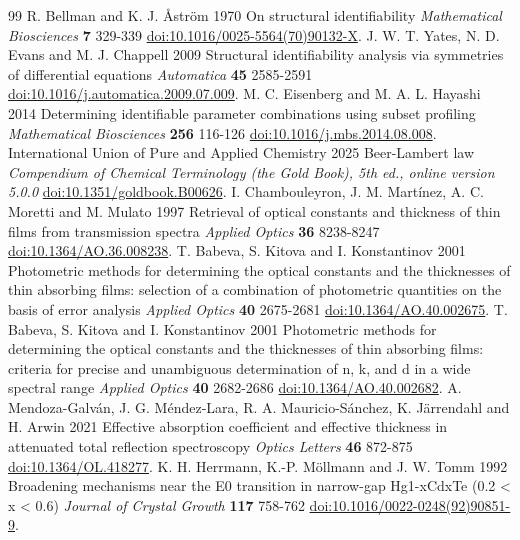 \documentclass[12pt]{article}
\begin{document}
\begin{thebibliography}{99}
 R. Bellman and K. J. Åström 1970 On structural identifiability \textit{Mathematical Biosciences} \textbf{7} 329-339 \href{https://doi.org/10.1016/0025-5564(70)90132-X}{doi:10.1016/0025-5564(70)90132-X}.
 J. W. T. Yates, N. D. Evans and M. J. Chappell 2009 Structural identifiability analysis via symmetries of differential equations \textit{Automatica} \textbf{45} 2585-2591 \href{https://doi.org/10.1016/j.automatica.2009.07.009}{doi:10.1016/j.automatica.2009.07.009}.
 M. C. Eisenberg and M. A. L. Hayashi 2014 Determining identifiable parameter combinations using subset profiling \textit{Mathematical Biosciences} \textbf{256} 116-126 \href{https://doi.org/10.1016/j.mbs.2014.08.008}{doi:10.1016/j.mbs.2014.08.008}.
 International Union of Pure and Applied Chemistry 2025 Beer-Lambert law \textit{Compendium of Chemical Terminology (the Gold Book), 5th ed., online version 5.0.0} \href{https://doi.org/10.1351/goldbook.B00626}{doi:10.1351/goldbook.B00626}.
 I. Chambouleyron, J. M. Martínez, A. C. Moretti and M. Mulato 1997 Retrieval of optical constants and thickness of thin films from transmission spectra \textit{Applied Optics} \textbf{36} 8238-8247 \href{https://doi.org/10.1364/AO.36.008238}{doi:10.1364/AO.36.008238}.
 T. Babeva, S. Kitova and I. Konstantinov 2001 Photometric methods for determining the optical constants and the thicknesses of thin absorbing films: selection of a combination of photometric quantities on the basis of error analysis \textit{Applied Optics} \textbf{40} 2675-2681 \href{https://doi.org/10.1364/AO.40.002675}{doi:10.1364/AO.40.002675}.
 T. Babeva, S. Kitova and I. Konstantinov 2001 Photometric methods for determining the optical constants and the thicknesses of thin absorbing films: criteria for precise and unambiguous determination of n, k, and d in a wide spectral range \textit{Applied Optics} \textbf{40} 2682-2686 \href{https://doi.org/10.1364/AO.40.002682}{doi:10.1364/AO.40.002682}.
 A. Mendoza-Galván, J. G. Méndez-Lara, R. A. Mauricio-Sánchez, K. Järrendahl and H. Arwin 2021 Effective absorption coefficient and effective thickness in attenuated total reflection spectroscopy \textit{Optics Letters} \textbf{46} 872-875 \href{https://doi.org/10.1364/OL.418277}{doi:10.1364/OL.418277}.
 K. H. Herrmann, K.-P. Möllmann and J. W. Tomm 1992 Broadening mechanisms near the E0 transition in narrow-gap Hg1-xCdxTe (0.2 < x < 0.6) \textit{Journal of Crystal Growth} \textbf{117} 758-762 \href{https://doi.org/10.1016/0022-0248(92)90851-9}{doi:10.1016/0022-0248(92)90851-9}.

\end{thebibliography}
\end{document}
